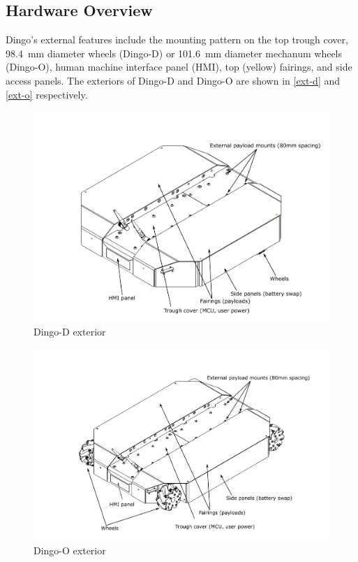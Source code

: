\documentclass[]{clearpath-latex/clearpath-manual}
\begin{document}
\subsection{Hardware Overview}

Dingo's external features include the mounting pattern on the top trough cover, \SI{98.4}{\mm} diameter
wheels (Dingo-D) or \SI{101.6}{\mm} diameter mechanum wheels (Dingo-O), human machine interface panel (HMI), top (yellow) fairings, and side access panels. The exteriors of Dingo-D and Dingo-O are shown in \autoref{ext-d} and \autoref{ext-o} respectively.

\begin{figure}[pt]
  \centering
  \includegraphics[width=12.0cm]{dingo-d-ext.pdf}
  \caption{Dingo-D exterior}
  \label{ext-d}
\end{figure}

\begin{figure}[pt]
  \centering
  \includegraphics[width=12.0cm]{dingo-o-ext.pdf}
  \caption{Dingo-O exterior}
  \label{ext-o}
\end{figure}
\end{document}
